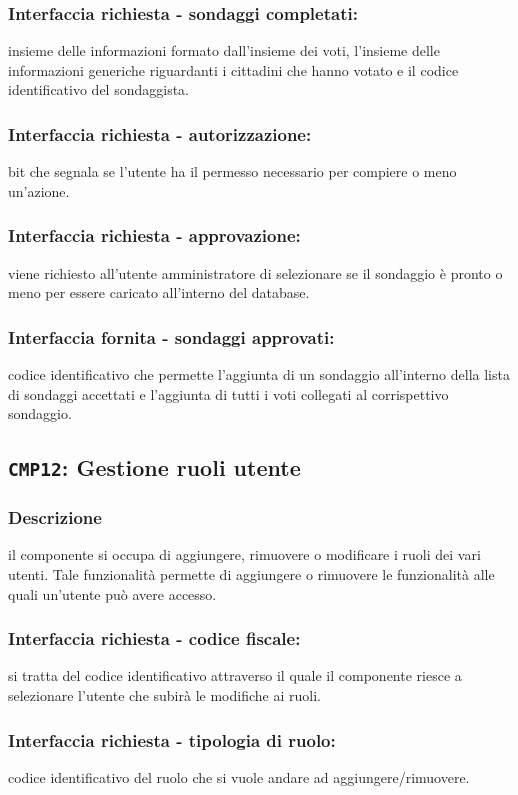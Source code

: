         \subsubsection{Interfaccia richiesta - sondaggi completati:}
            insieme delle informazioni formato dall'insieme dei voti, l'insieme delle informazioni generiche riguardanti i cittadini che hanno votato e il codice identificativo del sondaggista.
        \subsubsection{Interfaccia richiesta - autorizzazione:}
            bit che segnala se l'utente ha il permesso necessario per compiere o meno un'azione.
        \subsubsection{Interfaccia richiesta - approvazione:}
            viene richiesto all'utente amministratore di selezionare se il sondaggio è pronto o meno per essere caricato all'interno del database.
        \subsubsection{Interfaccia fornita - sondaggi approvati:}
            codice identificativo che permette l'aggiunta di un sondaggio all'interno della lista di sondaggi accettati e l'aggiunta di tutti i voti collegati al corrispettivo sondaggio.
    
    \subsection{\texttt{CMP12}: Gestione ruoli utente}
        \subsubsection{Descrizione}
            il componente si occupa di aggiungere, rimuovere o modificare i ruoli dei vari utenti. Tale funzionalità permette di aggiungere o rimuovere le funzionalità alle quali un'utente può avere accesso. 
        \subsubsection{Interfaccia richiesta - codice fiscale:}
            si tratta del codice identificativo attraverso il quale il componente riesce a selezionare l'utente che subirà le modifiche ai ruoli.
        \subsubsection{Interfaccia richiesta - tipologia di ruolo:}
            codice identificativo del ruolo che si vuole andare ad aggiungere/rimuovere.
